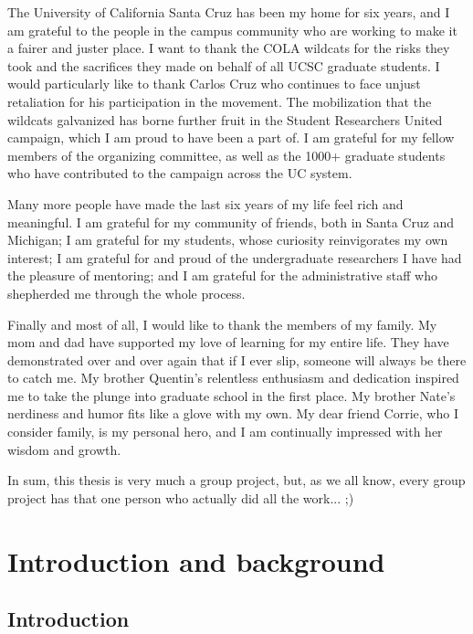 \documentclass[11pt]{ucthesis}
\begin{document}
\begin{frontmatter}
\begin{acknowledgements}
The University of California Santa Cruz has been my home for six years, and I am grateful to the people in the campus community who are working to make it a fairer and juster place. I want to thank the COLA wildcats for the risks they took and the sacrifices they made on behalf of all UCSC graduate students. I would particularly like to thank Carlos Cruz who continues to face unjust retaliation for his participation in the movement. The mobilization that the wildcats galvanized has borne further fruit in the Student Researchers United campaign, which I am proud to have been a part of. I am grateful for my fellow members of the organizing committee, as well as the 1000+ graduate students who have contributed to the campaign across the UC system.

Many more people have made the last six years of my life feel rich and meaningful. I am grateful for my community of friends, both in Santa Cruz and Michigan; I am grateful for my students, whose curiosity reinvigorates my own interest; I am grateful for and proud of the undergraduate researchers I have had the pleasure of mentoring; and I am grateful for the administrative staff who shepherded me through the whole process.

Finally and most of all, I would like to thank the members of my family. My mom and dad have supported my love of learning for my entire life. They have demonstrated over and over again that if I ever slip, someone will always be there to catch me. My brother Quentin's relentless enthusiasm and dedication inspired me to take the plunge into graduate school in the first place. My brother Nate's nerdiness and humor fits like a glove with my own. My dear friend Corrie, who I consider family, is my personal hero, and I am continually impressed with her wisdom and growth.

In sum, this thesis is very much a group project, but, as we all know, every group project has that one person who actually did all the work...  ;)

\end{acknowledgements}

\end{frontmatter}

\part{Introduction and background}

\chapter{Introduction}
\end{document}
